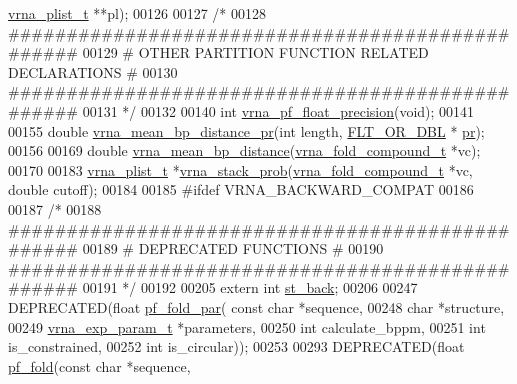 \begin{DoxyCode}
      \hyperlink{group__data__structures_structvrna__plist__s}{vrna\_plist\_t} **pl);
00126 
00127 \textcolor{comment}{/*}
00128 \textcolor{comment}{#################################################}
00129 \textcolor{comment}{# OTHER PARTITION FUNCTION RELATED DECLARATIONS #}
00130 \textcolor{comment}{#################################################}
00131 \textcolor{comment}{*/}
00132 
00140 \textcolor{keywordtype}{int} \hyperlink{part__func_8h_ad2b3594f0b50b68029e0f54fdce59313}{vrna\_pf\_float\_precision}(\textcolor{keywordtype}{void});
00141 
00155 \textcolor{keywordtype}{double} \hyperlink{group__pf__fold_gad3f0c240512e6d43e2e4d4c2076021f5}{vrna\_mean\_bp\_distance\_pr}(\textcolor{keywordtype}{int} length, \hyperlink{group__data__structures_ga31125aeace516926bf7f251f759b6126}{FLT\_OR\_DBL} *
      \hyperlink{fold__vars_8h_ac98ec419070aee6831b44e5c700f090f}{pr});
00156 
00169 \textcolor{keywordtype}{double} \hyperlink{group__pf__fold_gaa6b8983b559b9ef4b2e1b31113ea317b}{vrna\_mean\_bp\_distance}(\hyperlink{group__fold__compound_structvrna__fc__s}{vrna\_fold\_compound\_t} *vc);
00170 
00183 \hyperlink{group__data__structures_structvrna__plist__s}{vrna\_plist\_t} *\hyperlink{group__pf__fold_ga26e3cc2eb127a35625572e9275c24ee4}{vrna\_stack\_prob}(\hyperlink{group__fold__compound_structvrna__fc__s}{vrna\_fold\_compound\_t} *vc, \textcolor{keywordtype}{
      double} cutoff);
00184 
00185 \textcolor{preprocessor}{#ifdef  VRNA\_BACKWARD\_COMPAT}
00186 
00187 \textcolor{comment}{/*}
00188 \textcolor{comment}{#################################################}
00189 \textcolor{comment}{# DEPRECATED FUNCTIONS                          #}
00190 \textcolor{comment}{#################################################}
00191 \textcolor{comment}{*/}
00192 
00205 \textcolor{keyword}{extern}  \textcolor{keywordtype}{int} \hyperlink{group__subopt__stochbt_gacd79b1a570e6ad9be24cb11fe8cae30a}{st\_back};
00206 
00247 DEPRECATED(\textcolor{keywordtype}{float}   \hyperlink{group__pf__fold_gac4f95bee734b2563a3d6e9932117ebdf}{pf\_fold\_par}(  \textcolor{keyword}{const} \textcolor{keywordtype}{char} *sequence,
00248                       \textcolor{keywordtype}{char} *structure,
00249                       \hyperlink{group__energy__parameters_structvrna__exp__param__s}{vrna\_exp\_param\_t} *parameters,
00250                       \textcolor{keywordtype}{int} calculate\_bppm,
00251                       \textcolor{keywordtype}{int} is\_constrained,
00252                       \textcolor{keywordtype}{int} is\_circular));
00253 
00293 DEPRECATED(\textcolor{keywordtype}{float}   \hyperlink{group__pf__fold_gadc3db3d98742427e7001a7fd36ef28c2}{pf\_fold}(\textcolor{keyword}{const} \textcolor{keywordtype}{char} *sequence,

\end{DoxyCode}
